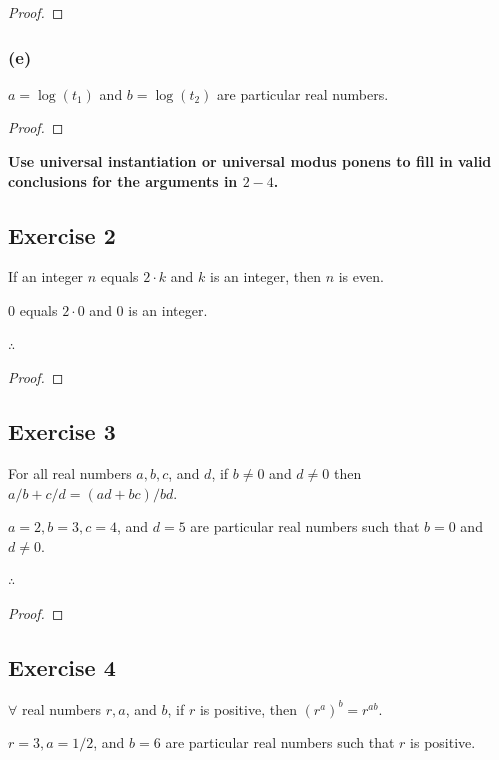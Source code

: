 \documentclass[14pt]{extarticle}
\newcommand{\fbl}{\underline{\hspace{1cm}}\,\,}
\newcommand{\fa}{\forall}
\begin{document}
\begin{proof}

\end{proof}

\subsubsection{(e)}
$a = \log(t_1)$ and $b = \log(t_2)$ are particular real numbers.

\begin{proof}

\end{proof}

{\bf \color{cyan} Use universal instantiation or universal modus ponens to fill in valid conclusions for the arguments in $2-4$.}

\subsection{Exercise 2}
If an integer $n$ equals $2\cdot k$ and $k$ is an integer, then $n$ is even.

0 equals $2\cdot 0$ and 0 is an integer.

$\therefore$ \fbl

\begin{proof}

\end{proof}

\subsection{Exercise 3}
For all real numbers $a, b, c$, and $d$, if $b \neq 0$ and $d \neq 0$ then $a/b + c/d = (ad + bc)/bd$.

$a = 2, b = 3, c = 4$, and $d = 5$ are particular real numbers such that $b = 0$ and $d \neq 0$.

$\therefore$ \fbl

\begin{proof}

\end{proof}

\subsection{Exercise 4}
$\fa$ real numbers $r, a$, and $b$, if $r$ is positive, then $(r^a)^b = r^{ab}$.

$r = 3, a = 1/2$, and $b = 6$ are particular real numbers such that $r$ is positive.
\end{document}
